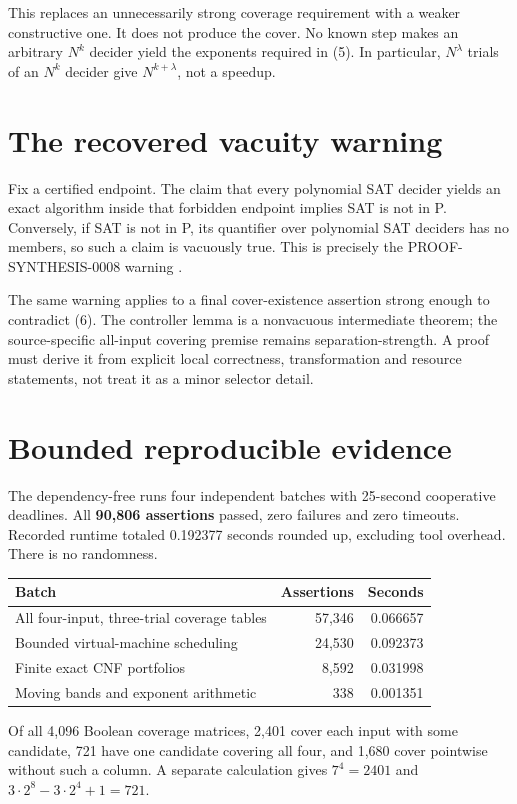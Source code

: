 \documentclass[11pt]{article}
\begin{document}
This replaces an unnecessarily strong coverage requirement with a weaker
constructive one. It does not produce the cover. No known step makes an
arbitrary $N^k$ decider yield the exponents required in (5). In particular,
$N^\lambda$ trials of an $N^k$ decider give $N^{k+\lambda}$, not a speedup.

\section{The recovered vacuity warning}
Fix a certified endpoint. The claim that every polynomial SAT decider yields
an exact algorithm inside that forbidden endpoint implies SAT is not in P.
Conversely, if SAT is not in P, its quantifier over polynomial SAT deciders
has no members, so such a claim is vacuously true. This is precisely the
PROOF-SYNTHESIS-0008 warning \cite{syn8}.

The same warning applies to a final cover-existence assertion strong enough
to contradict (6). The controller lemma is a nonvacuous intermediate theorem;
the source-specific all-input covering premise remains separation-strength.
A proof must derive it from explicit local correctness, transformation and
resource statements, not treat it as a minor selector detail.

\section{Bounded reproducible evidence}
The dependency-free  runs four independent
batches with 25-second cooperative deadlines. All \textbf{90,806 assertions}
passed, zero failures and zero timeouts. Recorded runtime totaled 0.192377
seconds rounded up, excluding tool overhead. There is no randomness.
\begin{center}\small
\begin{tabular}{lrr}\toprule
Batch & Assertions & Seconds\\\midrule
All four-input, three-trial coverage tables &57,346&0.066657\\
Bounded virtual-machine scheduling &24,530&0.092373\\
Finite exact CNF portfolios &8,592&0.031998\\
Moving bands and exponent arithmetic &338&0.001351\\\bottomrule
\end{tabular}\end{center}

Of all 4,096 Boolean coverage matrices, 2,401 cover each input with some
candidate, 721 have one candidate covering all four, and 1,680 cover
pointwise without such a column. A separate calculation gives
$7^4=2401$ and $3\cdot2^8-3\cdot2^4+1=721$.
\end{document}
